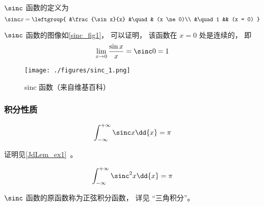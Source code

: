 

$\sinc$ 函数的定义为
\begin{equation}
\sinc x = 
\leftgroup{
&\frac{\sin x}{x} &\quad & (x \ne 0)\\
&\quad 1 && (x = 0)
}\end{equation}

$\sinc$ 函数的图像如\autoref{sinc_fig1}， 可以证明， 该函数在 $x=0$ 处是连续的， 即
\begin{equation}
\lim_{x \to 0}\frac{\sin x}{x} = \sinc 0 = 1
\end{equation}

\begin{figure}[ht]
\centering
\texttt{[image: ./figures/sinc\_1.png]}
\caption{sinc 函数（来自维基百科）} \label{sinc_fig1}
\end{figure}

\subsubsection{积分性质}
\begin{equation}\label{sinc_eq2}
\int_{-\infty}^{+\infty} \sinc x \dd{x} = \pi
\end{equation}

证明见\autoref{JdLem_ex1}~。

\begin{equation}\label{sinc_eq1}
\int_{-\infty}^{+\infty} \sinc^2 x \dd{x} = \pi
\end{equation}

$\sinc$ 函数的原函数称为正弦积分函数， 详见 “三角积分”。
